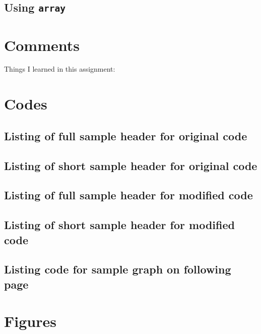 \documentclass{article}
\begin{document}
\subsection{Using \texttt{array}} %
\pagebreak

\section{Comments} %
Things I learned in this assignment:

\pagebreak
\appendix
\section{Codes}
\lstset{style=python103, language=python} 
\subsection{Listing of full sample header for original code}

\subsection{Listing of short sample header for original code}

\subsection{Listing of full sample header for modified code}

\subsection{Listing of short sample header for modified code}

\pagebreak
\subsection{Listing code for sample graph on following page}


\pagebreak
\section{Figures \label{FigureList}}
\end{document}

